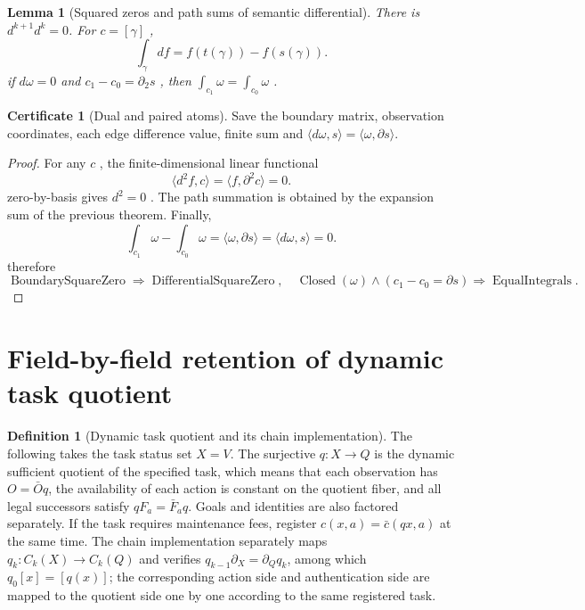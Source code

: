 \documentclass[12pt,a4paper,openany,notitlepage]{report}
\theoremstyle{plain}
\newtheorem{lemma}[theorem]{Lemma}
\theoremstyle{definition}
\newtheorem{definition}[theorem]{Definition}
\newtheorem*{certificate}{Certificate}
\theoremstyle{remark}
\begin{document}
\begin{CJK*}
\begin{lemma}
[Squared zeros and path sums of semantic differential]\label{hgov:lem:semanticdiff}
There is $d^{k+1}d^k=0$. For $c=[\gamma]$ , \[
\int_\gamma df=f(t(\gamma))-f(s(\gamma)).
\] if $d\omega=0$ and $c_1-c_0=\partial_2s$ , then $\int_{c_1}\omega=\int_{c_0}\omega$ .\end{lemma}
\begin{certificate}
[Dual and paired atoms]Save the boundary matrix, observation coordinates, each edge difference value, finite sum and $\langle d\omega,s\rangle=\langle\omega,\partial s\rangle$.\end{certificate}
\begin{proof}
For any $c$ , the finite-dimensional linear functional \[
\langle d^2f,c\rangle=\langle f,\partial^2c\rangle=0.
\] zero-by-basis gives $d^2=0$ . The path summation is obtained by the expansion sum of the previous theorem. Finally, \[
\int_{c_1}\omega-\int_{c_0}\omega
=\langle\omega,\partial s\rangle
=\langle d\omega,s\rangle=0.
\] therefore \[
\operatorname{BoundarySquareZero}\Rightarrow\operatorname{DifferentialSquareZero},
\quad
\operatorname{Closed}(\omega)\land(c_1-c_0=\partial s)
\Rightarrow\operatorname{EqualIntegrals}.
\]\end{proof}


\section { Field-by-field retention of dynamic task quotient }

\begin{definition}
[Dynamic task quotient and its chain implementation]\label{hgov:def:quotient}
The following takes the task status set $X=V$. The surjective $q:X\to Q$ is the dynamic sufficient quotient of the specified task, which means that each observation has $O=\bar Oq$, the availability of each action is constant on the quotient fiber, and all legal successors satisfy $qF_a=\bar F_aq$. Goals and identities are also factored separately. If the task requires maintenance fees, register $c(x,a)=\bar c(qx,a)$ at the same time. The chain implementation separately maps $q_k:C_k(X)\to C_k(Q)$ and verifies $q_{k-1}\partial_X=\partial_Qq_k$, among which $q_0[x]=[q(x)]$; the corresponding action side and authentication side are mapped to the quotient side one by one according to the same registered task.\end{definition}



\end{CJK*}
\end{document}
